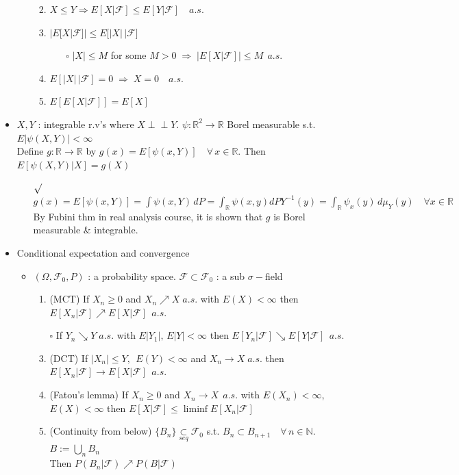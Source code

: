 \documentclass[12pt, A4]{article}
\newcommand{\indep}{\perp \!\!\! \perp}
\newcommand{\sq}{$\square$}
\newcommand{\rmk}{$\surd$}
\newcommand{\N}{\mathbb{N}}
\newcommand{\R}{\mathbb{R}}
\newcommand{\F}{\mathcal{F}}
\newcommand{\seq}{\underset{seq}{\subset}}
\newcommand{\foranyn}{\quad \forall \, n\in \N}
\begin{document}
\begin{itemize}
\begin{itemize}
\begin{enumerate}
\begin{itemize}
			\end{itemize}
			\item $X\leq Y \Rightarrow E[X|\F]\leq E[Y|\F]\quad a.s$.
			\item $\big|E[X|\F]\big|\leq E\big[|X| \,\big| \F\big]$
			\begin{itemize}
				\item[\sq] $|X|\leq M$ for some $M>0 \; \Rightarrow \; \big|E[X|\F]\big|\leq M\;\,a.s.$
			\end{itemize}
			\item $E[|X| \, |\F]=0\; \Rightarrow \;X=0 \quad a.s.$
			\item $E[E[X|\F]]=E[X]$
		\end{enumerate}
	\end{itemize}
	\item $X, Y$ : integrable r.v's where $X\indep Y$.\; $\psi :\R^2\rightarrow \R$ Borel measurable s.t. $E|\psi(X, Y)|<\infty$ \\ Define $g:\R\rightarrow \R$ by $g(x)=E[\psi(x, Y)]\quad \forall\, x\in \R$. \quad Then $E[\psi(X,Y)|X]=g(X)$
	\begin{itemize}
		\item[\rmk] $g(x)=E[\psi(x, Y)]=\int \psi(x, Y)\, dP =\int_\R \psi(x,y) dPY^{-1}(y)=\int_\R \psi_x(y)\, d\mu_Y(y) \quad \forall x\in \R$ \\ By Fubini thm in real analysis course, it is shown that $g$ is Borel measurable \& integrable.
	\end{itemize}
	\item Conditional expectation and convergence
	\begin{itemize}
		\item $(\Omega, \F_0, P)$ : a probability space.\; $\F\subset \F_0$ : a sub $\sigma-$field
		\begin{enumerate}
			\item (MCT) If $X_n\geq 0$ and $X_n\nearrow X\; a.s.$ with $E(X)<\infty$ then $E[X_n|\F]\nearrow E[X|\F]\;\, a.s.$
			\item[\sq] If $Y_n\searrow Y\; a.s.$ with $E|Y_1|,\, E|Y|<\infty$ then $E[Y_n|\F]\searrow E[Y|\F]\;\, a.s.$
			\item (DCT) If $|X_n|\leq Y,\,\; E(Y)<\infty$ and $X_n\rightarrow X\; a.s.$ then $E[X_n|\F]\rightarrow E[X|\F]\;\,a.s.$
			\item (Fatou's lemma) If $X_n\geq 0$ and $X_n\rightarrow X\;\,a.s.$ with $E(X_n)<\infty$, $E(X)<\infty$ then $E[X|\F]\leq \liminf E[X_n|\F]$  
			\item (Continuity from below) $\{B_n\}\seq \F_0$ s.t. $B_n\subset B_{n+1}\foranyn$. \;$B:=\bigcup_n B_n$ \\ Then $P(B_n|\F)\nearrow P(B|\F)$

\end{enumerate}
\end{itemize}
\end{itemize}
\end{document}
